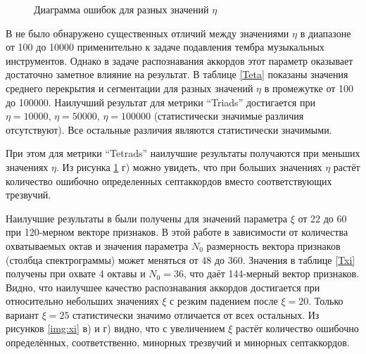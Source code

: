 \begin{figure}[htbp]
  \begin{minipage}[h]{0.49\linewidth}
  \end{minipage}
  \hfill
  \begin{minipage}[h]{0.49\linewidth}
  \end{minipage}
  \hfill
  \begin{minipage}[h]{0.49\linewidth}
  \end{minipage}
  \hfill
  \begin{minipage}[h]{0.49\linewidth}
  \end{minipage}
  \caption{Диаграмма ошибок для разных значений $\eta$}
  \label{img:logEta}
\end{figure}

В \cite{Mueller2009} не было обнаружено существенных отличий между значениями
$\eta$ в диапазоне от 100 до 10000 применительно к задаче подавления тембра
музыкальных инструментов. Однако в задаче распознавания аккордов этот параметр
оказывает достаточно заметное влияние на результат. В таблице \ref{Teta}
показаны значения среднего перекрытия и сегментации для разных значений $\eta$
в промежутке от 100 до 100000. Наилучший результат для метрики ``Triads''
достигается при $\eta=10000$, $\eta=50000$, $\eta=100000$ (статистически
значимые различия отсутствуют). Все остальные различия являются статистически
значимыми.

При этом для метрики ``Tetrads'' наилучшие результаты получаются при меньших
значениях $\eta$. Из рисунка \ref{img:logEta} г) можно увидеть, что при больших
значениях $\eta$ растёт количество ошибочно определенных септаккордов вместо
соответствующих трезвучий.

Наилучшие результаты в \cite{Mueller2009} были получены для значений параметра
$\xi$ от 22 до 60 при 120-мерном векторе признаков. В этой работе в зависимости
от количества охватываемых октав и значения параметра $N_0$ размерность вектора
признаков (столбца спектрограммы) может меняться от 48 до 360. Значения в
таблице \ref{Txi} получены при охвате 4 октавы и $N_0=36$, что даёт 144-мерный
вектор признаков. Видно, что наилучшее качество распознавания аккордов
достигается при относительно небольших значениях $\xi$ с резким падением после
$\xi=20$. Только вариант $\xi=25$ статистически значимо отличается от всех
остальных. Из рисунков \ref{img:xi} в) и г) видно, что с увеличением $\xi$
растёт количество ошибочно определённых, соответственно, минорных трезвучий и
минорных септаккордов.

